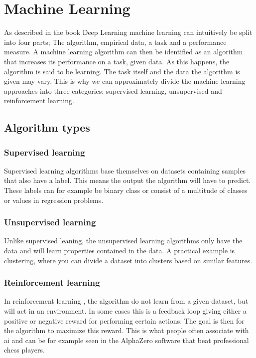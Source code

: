     
\clearpage
\section{Machine Learning} \label{Machine Learning}
    As described in the book Deep Learning\cite{Goodfellow-et-al-2016_ML} machine learning can intuitively be split into four parts; The algorithm, empirical data, a task and a performance measure. A machine learning algorithm can then be identified as an algorithm that increases its performance on a task, given data. As this happens, the algorithm is said to be learning. The task itself and the data the algorithm is given may vary. This is why we can approximately divide the machine learning approaches into three categories\cite{Goodfellow-et-al-2016_E}: supervised learning, unsupervised and reinforcement learning. 
    
    \subsection{Algorithm types} \label{Algorithm types}
        \subsubsection{Supervised learning}
            Supervised learning \cite{Goodfellow-et-al-2016_E} algorithms base themselves on datasets containing samples that also have a label. This means the output the algorithm will have to predict. These labels can for example be binary class or consist of a multitude of classes or values in regression problems.
            
        \subsubsection{Unsupervised learning}
            Unlike supervised leaning, the unsupervised learning \cite{Goodfellow-et-al-2016_E} algorithms only have the data and will learn properties contained in the data. A practical example is clustering, where you can divide a dataset into clusters based on similar features. 
                
        \subsubsection{Reinforcement learning}
            In reinforcement learning \cite{Goodfellow-et-al-2016_E}, the algorithm do not learn from a given dataset, but will act in an environment. In some cases this is a feedback loop giving either a positive or negative reward for performing certain actions. The goal is then for the algorithm to maximize this reward. This is what people often associate with \gls{ai} and can be for example seen in the AlphaZero software that beat professional chess players\cite{silver2017mastering}.
    
